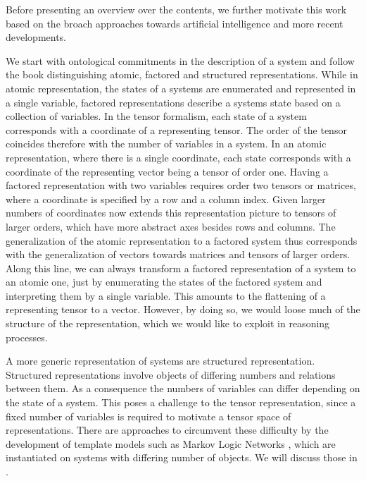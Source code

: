 Before presenting an overview over the contents, we further motivate this work based on the broach approaches towards artificial intelligence and more recent developments.


We start with ontological commitments in the description of a system and follow the book \cite{russell_artificial_2021} distinguishing atomic, factored and structured representations.
While in atomic representation, the states of a systems are enumerated and represented in a single variable, factored representations describe a systems state based on a collection of variables.
In the tensor formalism, each state of a system corresponds with a coordinate of a representing tensor.
The order of the tensor coincides therefore with the number of variables in a system.
In an atomic representation, where there is a single coordinate, each state corresponds with a coordinate of the representing vector being a tensor of order one.
Having a factored representation with two variables requires order two tensors or matrices, where a coordinate is specified by a row and a column index.
Given larger numbers of coordinates now extends this representation picture to tensors of larger orders, which have more abstract axes besides rows and columns.
The generalization of the atomic representation to a factored system thus corresponds with the generalization of vectors towards matrices and tensors of larger orders.
Along this line, we can always transform a factored representation of a system to an atomic one, just by enumerating the states of the factored system and interpreting them by a single variable.
This amounts to the flattening of a representing tensor to a vector.
However, by doing so, we would loose much of the structure of the representation, which we would like to exploit in reasoning processes.

A more generic representation of systems are structured representation.
Structured representations involve objects of differing numbers and relations between them.
As a consequence the numbers of variables can differ depending on the state of a system.
This poses a challenge to the tensor representation, since a fixed number of variables is required to motivate a tensor space of representations.
There are approaches to circumvent these difficulty by the development of template models such as Markov Logic Networks \cite{richardson_markov_2006}, which are instantiated on systems with differing number of objects.
We will discuss those in .

